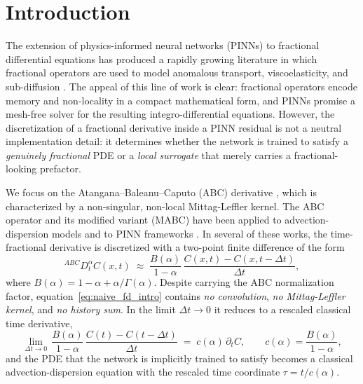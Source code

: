 \documentclass[11pt]{article}
\begin{document}
\newpage

\section{Introduction}
\label{sec:intro}

The extension of physics-informed neural networks (PINNs) \cite{Raissi2019} to fractional differential equations has produced a rapidly growing literature in which fractional operators are used to model anomalous transport, viscoelasticity, and sub-diffusion \cite{Pang2019, Toan2025}. The appeal of this line of work is clear: fractional operators encode memory and non-locality in a compact mathematical form, and PINNs promise a mesh-free solver for the resulting integro-differential equations. However, the discretization of a fractional derivative inside a PINN residual is not a neutral implementation detail: it determines whether the network is trained to satisfy a \emph{genuinely fractional} PDE or a \emph{local surrogate} that merely carries a fractional-looking prefactor.

We focus on the Atangana--Baleanu--Caputo (ABC) derivative \cite{Atangana2016}, which is characterized by a non-singular, non-local Mittag-Leffler kernel. The ABC operator and its modified variant (MABC) have been applied to advection-dispersion models \cite{AzZobi2025, Chawla2022} and to PINN frameworks \cite{AzZobi2025}. In several of these works, the time-fractional derivative is discretized with a two-point finite difference of the form
\begin{equation}
{}^{ABC}D_t^\alpha C(x,t) \;\approx\; \frac{B(\alpha)}{1-\alpha}\,\frac{C(x,t)-C(x,t-\Delta t)}{\Delta t},
\label{eq:naive_fd_intro}
\end{equation}
where \(B(\alpha) = 1-\alpha+\alpha/\Gamma(\alpha)\). Despite carrying the ABC normalization factor, equation~\eqref{eq:naive_fd_intro} contains \emph{no convolution}, \emph{no Mittag-Leffler kernel}, and \emph{no history sum}. In the limit \(\Delta t \to 0\) it reduces to a rescaled classical time derivative,
\begin{equation}
\lim_{\Delta t\to 0}\, \frac{B(\alpha)}{1-\alpha}\,\frac{C(t)-C(t-\Delta t)}{\Delta t}
\;=\;
c(\alpha)\,\partial_t C, \qquad c(\alpha) = \frac{B(\alpha)}{1-\alpha},
\end{equation}
and the PDE that the network is implicitly trained to satisfy becomes a classical advection-dispersion equation with the rescaled time coordinate \(\tau = t/c(\alpha)\).
\end{document}
